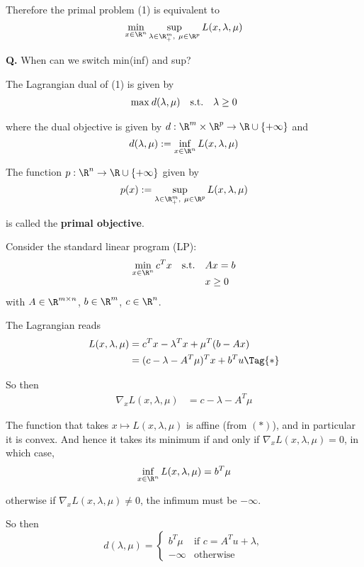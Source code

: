 Therefore the primal problem (1) is equivalent to
$$
  \min_{x\in\R^n}\sup_{\lambda\in\R^m_+,\ \mu\in\R^p}L(x,\lambda,\mu)
$$

\textbf{Q.} When can we switch min(inf) and sup?

\label{f6ab91b}

The Lagrangian dual of (1) is given by
$$
  \begin{array}{l l l l}
    \max_{}d(\lambda,\mu) & \text{s.t.} & \lambda\geq0
  \end{array}
$$

where the dual objective is given by $d:\R^m\times\R^p\to\R\cup\{+\infty\}$ and
$$
  d(\lambda,\mu):=\inf_{x\in\R^n}L(x,\lambda,\mu)
$$

The function $p:\R^n\to\R\cup\{+\infty\}$ given by
$$
  p(x):=\sup_{\lambda\in\R^m_+,\ \mu\in\R^p}
  L(x,\lambda,\mu)
$$

is called the \textbf{primal objective}.

\label{ab8429b}

Consider the standard linear program (LP):
$$
  \begin{array}{l l l}
    \displaystyle \min_{x\in\R^n}c^Tx
     & \text{s.t.} & Ax=b   \\
     &             & x\geq0
  \end{array}
$$
with $A\in\R^{m\times n}$, $b\in\R^m$, $c\in\R^n$.

The Lagrangian reads
\begin{align*}
  L(x,\lambda,\mu)
   & =c^Tx-\lambda^Tx+\mu^T(b-Ax)         \\
   & =(c-\lambda-A^T\mu)^Tx + b^Tu\Tag{*}
\end{align*}


So then
\begin{align*}
  \nabla_xL(x,\lambda,\mu)
   & =c-\lambda-A^T\mu
\end{align*}

The function that takes $x\mapsto L(x,\lambda,\mu)$ is affine (from $(*)$), and
in particular it is convex. And hence it takes its minimum if and only if
$\nabla_xL(x,\lambda,\mu)=0$, in which case,
$$
  \inf_{x\in\R^n}L(x,\lambda,\mu)=b^T\mu
$$

otherwise if $\nabla_xL(x,\lambda,\mu)\neq0$, the infimum must be $-\infty$.

So then
$$
  d(\lambda,\mu)=\begin{cases}
    b^T\mu  & \text{if }c=A^Tu+\lambda, \\
    -\infty & \text{otherwise}
  \end{cases}
$$

